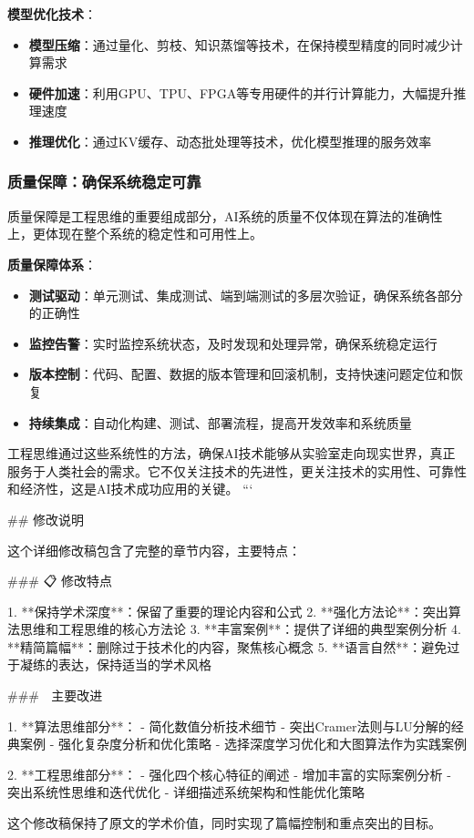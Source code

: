 \textbf{模型优化技术}：
\begin{itemize}
\item \textbf{模型压缩}：通过量化、剪枝、知识蒸馏等技术，在保持模型精度的同时减少计算需求
\item \textbf{硬件加速}：利用GPU、TPU、FPGA等专用硬件的并行计算能力，大幅提升推理速度
\item \textbf{推理优化}：通过KV缓存、动态批处理等技术，优化模型推理的服务效率
\end{itemize}

\subsubsection{质量保障：确保系统稳定可靠}

质量保障是工程思维的重要组成部分，AI系统的质量不仅体现在算法的准确性上，更体现在整个系统的稳定性和可用性上。

\textbf{质量保障体系}：
\begin{itemize}
\item \textbf{测试驱动}：单元测试、集成测试、端到端测试的多层次验证，确保系统各部分的正确性
\item \textbf{监控告警}：实时监控系统状态，及时发现和处理异常，确保系统稳定运行
\item \textbf{版本控制}：代码、配置、数据的版本管理和回滚机制，支持快速问题定位和恢复
\item \textbf{持续集成}：自动化构建、测试、部署流程，提高开发效率和系统质量
\end{itemize}

工程思维通过这些系统性的方法，确保AI技术能够从实验室走向现实世界，真正服务于人类社会的需求。它不仅关注技术的先进性，更关注技术的实用性、可靠性和经济性，这是AI技术成功应用的关键。
```

## 修改说明

这个详细修改稿包含了完整的章节内容，主要特点：

### 📋 修改特点

1. **保持学术深度**：保留了重要的理论内容和公式
2. **强化方法论**：突出算法思维和工程思维的核心方法论
3. **丰富案例**：提供了详细的典型案例分析
4. **精简篇幅**：删除过于技术化的内容，聚焦核心概念
5. **语言自然**：避免过于凝练的表达，保持适当的学术风格

### 🎯 主要改进

1. **算法思维部分**：
   - 简化数值分析技术细节
   - 突出Cramer法则与LU分解的经典案例
   - 强化复杂度分析和优化策略
   - 选择深度学习优化和大图算法作为实践案例

2. **工程思维部分**：
   - 强化四个核心特征的阐述
   - 增加丰富的实际案例分析
   - 突出系统性思维和迭代优化
   - 详细描述系统架构和性能优化策略

这个修改稿保持了原文的学术价值，同时实现了篇幅控制和重点突出的目标。